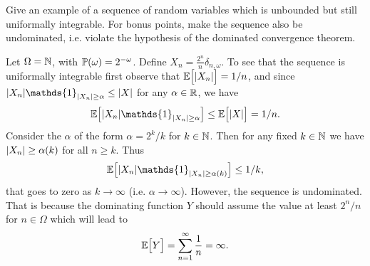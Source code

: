 \begin{problem}
	Give an example of a sequence of random variables which is unbounded but still uniformally integrable. For bonus points, make the sequence also be undominated, i.e. violate the hypothesis of the dominated convergence theorem.
\end{problem}
\begin{solution}
	Let $ \Omega = \mathbb{N} $, with $ \mathbb{P}(\omega) = 2^{-\omega} $. Define $ X_n = \frac{2^n}{n}\delta_{n,\omega} $. To see that the sequence is uniformally integrable first observe that $ \mathbb{E}\big[|X_n|\big] = 1/n $, and since $ \abs{X_n}\mathds{1}_{\abs{X_n}\geq \alpha} \leq \abs{X} $ for any $ \alpha\in \mathbb{R} $, we have
	\[ \E{\abs{X_n}\mathds{1}_{\abs{X_n}\geq\alpha}} \leq \E{\abs{X}} = 1/n. \]
	Consider the $ \alpha $ of the form $ \alpha = 2^k/k $ for $ k\in \mathbb{N} $. Then for any fixed $ k\in \mathbb{N} $ we have $ |X_n|\geq \alpha(k) $ for all $ n\geq k $. Thus
	\[ \E{\abs{X_n}\mathds{1}_{\abs{X_n}\geq\alpha(k)}} \leq 1/k, \]
	that goes to zero as $ k\to\infty $ (i.e. $ \alpha\to \infty $). However, the sequence is undominated. That is because the dominating function $ Y $ should assume the value at least $ 2^n/n $ for $ n\in\Omega $ which will lead to
	\[ \mathbb{E}\big[Y\big] = \sum_{n=1}^{\infty}\frac{1}{n} = \infty. \]
\end{solution}


